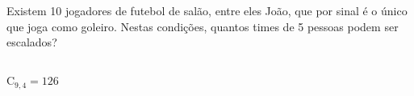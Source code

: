 \begin{ex}
 Existem 10 jogadores de futebol de salão, entre eles João, que por sinal é o único que joga como goleiro. Nestas condições, quantos times de 5 pessoas podem ser escalados?
   \begin{sol}
     \phantom{A} \\
     $\mathrm{C}_{9,4}=126$
   \end{sol}
\end{ex}